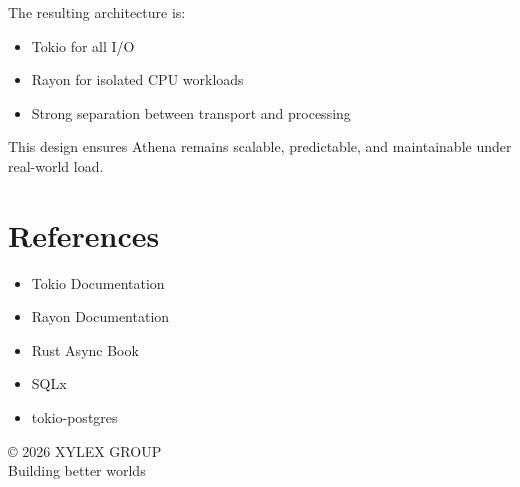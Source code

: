 \documentclass[11pt,a4paper]{article}
\begin{document}
The resulting architecture is:

\begin{itemize}
\item Tokio for all I/O
\item Rayon for isolated CPU workloads
\item Strong separation between transport and processing
\end{itemize}

This design ensures Athena remains scalable, predictable, and maintainable under real-world load.

\newpage

\section{References}

\begin{itemize}
\item Tokio Documentation
\item Rayon Documentation
\item Rust Async Book
\item SQLx
\item tokio-postgres
\end{itemize}

\vfill

\begin{center}
© 2026 XYLEX GROUP \\
Building better worlds
\end{center}
\end{document}

